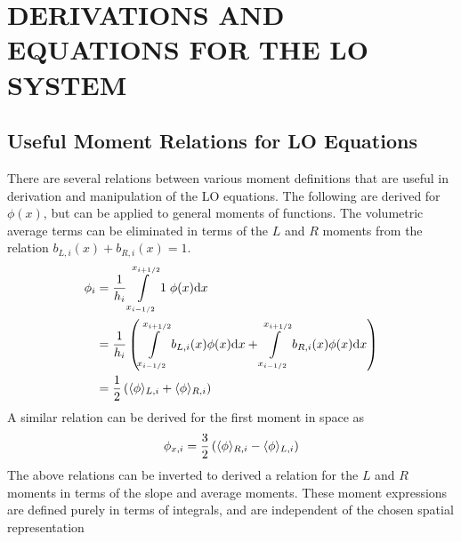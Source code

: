 %
%
%



\chapter{\uppercase{Derivations and Equations for the LO System}}

\section{Useful Moment Relations for LO Equations}
\label{app:lo_mom_relations}

There are several relations between various moment definitions that are useful in
derivation and manipulation of the LO equations. The following are derived for $\phi(x)$,
but can be applied to general moments of functions.  The volumetric average terms
can be eliminated in terms of the $L$ and $R$ moments from the relation
$b_{L,i}(x)+b_{R,i}(x)=1$.
\begin{align}\label{app:atoL}
    \phi_{i} &= \frac{1}{h_i} \int\limits_{{x_{i-1/2}}}^{{x_{i+1/2}}} 1 \;\phi(x) \mathrm{d} x \\
             &= \frac{1}{h_i} \left(\int\limits_{{x_{i-1/2}}}^{{x_{i+1/2}}} b_{L,i}(x) \phi(x) \mathrm{d} x +
             \int\limits_{{x_{i-1/2}}}^{{x_{i+1/2}}} b_{R,i}(x) \phi(x) \mathrm{d} x \right)\\
             &= \frac{1}{2} \left( \langle \phi \rangle_{L,i} + \langle \phi \rangle_{R,i} \right)
\end{align}
A similar relation can be derived for the first moment in space as
\begin{equation}
    {\phi}_{x,i} = \frac{3}{2} \left(\langle \phi \rangle_{R,i} - \langle \phi \rangle_{L,i}\right)
\end{equation}
The above relations can be inverted to derived a relation for the $L$ and $R$ moments in terms of the slope
and average moments.  These moment expressions are defined purely in terms of integrals,
and are independent of the chosen spatial representation

